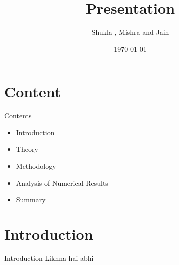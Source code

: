 \documentclass{beamer}
\title{Presentation}
\date{\today}
\author{Shukla , Mishra and Jain}
\begin{document}
\maketitle

\section{Content}
\begin{frame}{Contents}

\begin{itemize}
\item Introduction 
\item Theory
\item Methodology
\item Analysis of Numerical Results
\item Summary 
\end{itemize}

\end{frame}

\section{Introduction}
\begin{frame}{Introduction}
   Likhna hai abhi 
\end{frame}
\end{document}
